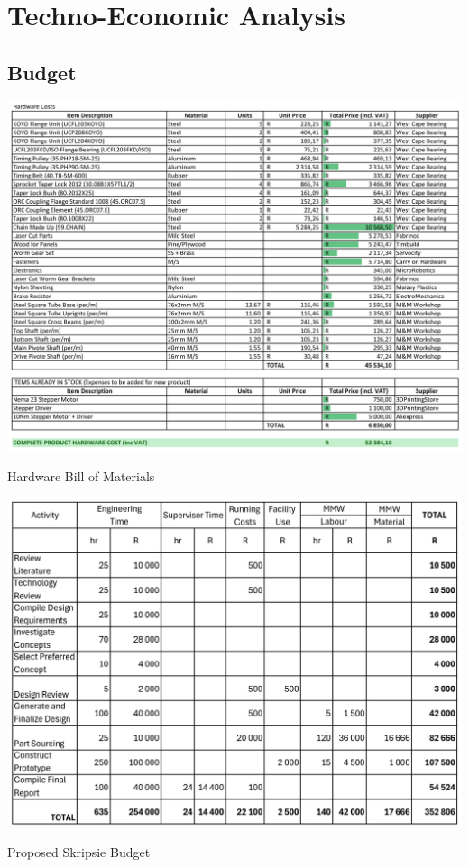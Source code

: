 \chapter{Techno-Economic Analysis}

\section{Budget}
\label{appx:skripsie-budget}

\begin{table}[ht]
    \centering
    \includegraphics[width=1\linewidth]{tables/hardware_BOM.pdf}
    \caption{Hardware Bill of Materials}
    \label{tab:hardware-BOM}
\end{table}


\begin{table}[ht]
    \centering
    \includegraphics[width=1\linewidth]{tables/skripsie_budget_1.pdf}
    \caption{Proposed Skripsie Budget}
\end{table}

